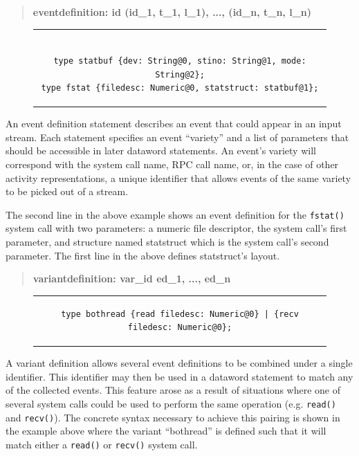 \begin{quote}
\centering
\textbf{eventdefinition: id (id\_1, t\_1, l\_1), ..., (id\_n, t\_n, l\_n) }
\end{quote}

\begin{figure}[H]
\centering
\begin{tabular}{c}
\begin{lstlisting}

type statbuf {dev: String@0, stino: String@1, mode: String@2};
type fstat {filedesc: Numeric@0, statstruct: statbuf@1};

\end{lstlisting}
\end{tabular}
\end{figure}

An event definition statement describes an event that could appear in an input
stream.  Each statement specifies an event ``variety'' and a list of
parameters that should be accessible in later dataword statements.
An event's variety will correspond
with the system call name, RPC call name, or, in the case of other activity
representations, a unique identifier that allows events of the same
variety to be picked out of a stream.

The second line in the above example shows an event
definition for
the {\tt fstat()} system call
with two parameters:
a numeric file descriptor, the system call's first parameter,
and structure named statstruct
which is the system call's second parameter.
The first line in the above defines statstruct's layout.


\begin{quote}
\centering
\textbf{variantdefinition: var\_id ed\_1, ..., ed\_n}
\end{quote}

\begin{figure}[H]
\centering
\begin{tabular}{c}
\begin{lstlisting}
type bothread {read filedesc: Numeric@0} | {recv filedesc: Numeric@0};
\end{lstlisting}
\end{tabular}
\end{figure}

A variant definition allows several event definitions to be combined under
a single identifier.  This identifier may then be used in a dataword
statement to match any of the collected events.  This feature arose as a
result of situations where one of several system calls could be used to
perform the same operation (e.g. {\tt read()} and {\tt recv()}).  The
concrete syntax necessary to achieve this pairing is shown in the example
above where the variant ``bothread'' is defined such that it will match
either a {\tt read()} or {\tt recv()} system call.

